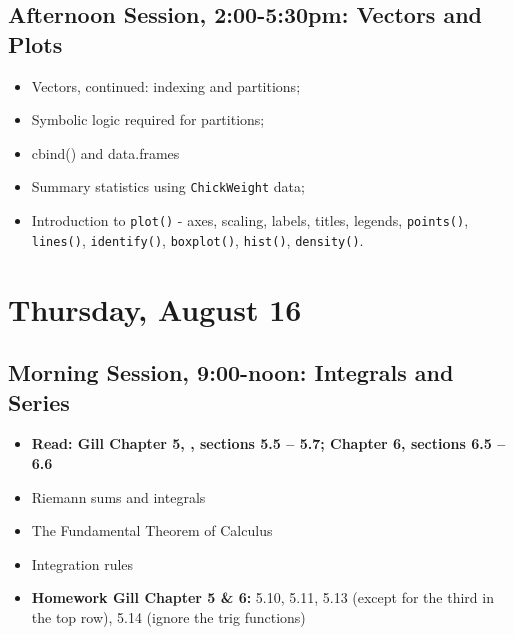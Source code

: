 \documentclass[12pt,a4paper]{article}
\begin{document}
\subsection*{Afternoon Session, 2:00-5:30pm: Vectors and Plots}
\begin{itemize}
\setlength{\itemsep}{0pt}
\footnotesize
\item Vectors, continued: indexing and partitions;
\item Symbolic logic required for partitions;
\item cbind() and data.frames
\item Summary statistics using \texttt{ChickWeight} data;
\item Introduction to \texttt{plot()} - axes, scaling, labels, titles, legends, \texttt{points()}, \texttt{lines()}, \texttt{identify()}, \texttt{boxplot()}, \texttt{hist()}, \texttt{density()}.
\end{itemize}


\section*{Thursday, August 16}

\subsection*{Morning Session, 9:00-noon: Integrals and Series}
\begin{itemize}
\setlength{\itemsep}{0pt}
\footnotesize
\item \textbf{Read: Gill Chapter 5, , sections 5.5 -- 5.7; Chapter 6, sections 6.5 -- 6.6}
\item Riemann sums and integrals
\item The Fundamental Theorem of Calculus
\item Integration rules
\item \textbf{Homework Gill Chapter 5 \& 6:} 5.10, 5.11, 5.13 (except for the third in the top
row), 5.14 (ignore the trig functions)

\end{itemize}
\end{document}
